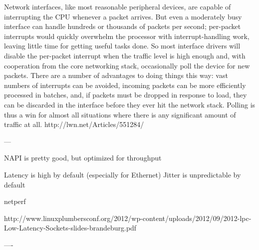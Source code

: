 Network interfaces, like most reasonable peripheral devices, are capable of interrupting the CPU whenever a packet arrives. But even a moderately busy interface can handle hundreds or thousands of packets per second; per-packet interrupts would quickly overwhelm the processor with interrupt-handling work, leaving little time for getting useful tasks done. So most interface drivers will disable the per-packet interrupt when the traffic level is high enough and, with cooperation from the core networking stack, occasionally poll the device for new packets. There are a number of advantages to doing things this way: vast numbers of interrupts can be avoided, incoming packets can be more efficiently processed in batches, and, if packets must be dropped in response to load, they can be discarded in the interface before they ever hit the network stack. Polling is thus a win for almost all situations where there is any significant amount of traffic at all. 
http://lwn.net/Articles/551284/

---

NAPI is pretty good, but optimized for throughput

Latency is high by default (especially for Ethernet)
Jitter is unpredictable by default

netperf

http://www.linuxplumbersconf.org/2012/wp-content/uploads/2012/09/2012-lpc-Low-Latency-Sockets-slides-brandeburg.pdf

----

